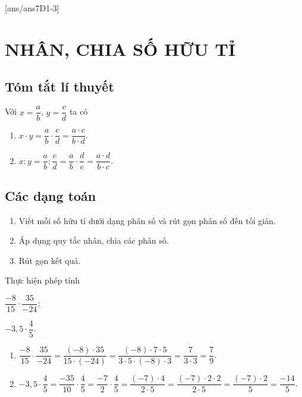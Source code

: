 [ans/ans7D1-3]

\section{NHÂN, CHIA SỐ HỮU TỈ}
\subsection{Tóm tắt lí thuyết}
Với $x=\dfrac{a}{b}$, $y=\dfrac{c}{d}$ ta có
	\begin{enumerate}[\tickEX]
\item $x\cdot y= \dfrac{a}{b}\cdot \dfrac{c}{d} = \dfrac{a \cdot c}{b \cdot d}$.
\item $x:  y= \dfrac{a}{b} : \dfrac{c}{d} = \dfrac{a}{b} \cdot \dfrac{d}{c}=\dfrac{a \cdot d}{b \cdot c}$.
	\end{enumerate}

\subsection{Các dạng toán}
\begin{dang}
	\begin{enumerate}[\tickEX]
		\item Viết mỗi số hữu tỉ dưới dạng phân số và rút gọn phân số đến tối giản.
		\item Áp dụng quy tắc nhân, chia các phân số.
		\item Rút gọn kết quả.
	\end{enumerate}
\end{dang}

\begin{vd}
	Thực hiện phép tính
		\begin{listEX}[2]
		\item $\dfrac{-8}{15} \cdot \dfrac{35}{-24}$;
		\item $-3,5 \cdot \dfrac{4}{5}$. 
	\end{listEX}
	\loigiai
	{\begin{enumerate}
			\item $\dfrac{-8}{15} \cdot \dfrac{35}{-24}= \dfrac{(-8) \cdot 35 }{15 \cdot (-24)} = \dfrac{(-8) \cdot 7 \cdot 5}{3 \cdot 5 \cdot (-8) \cdot 3} = \dfrac{7}{3\cdot 3} = \dfrac{7}{9} $.
			\item $-3,5 \cdot \dfrac{4}{5} = \dfrac{-35}{10} \cdot \dfrac{4}{5} = \dfrac{-7}{2} \cdot \dfrac{4}{5} = \dfrac{(-7) \cdot 4}{2 \cdot 5} =  \dfrac{(-7) \cdot 2 \cdot 2}{2 \cdot 5} =  \dfrac{(-7) \cdot 2}{5} =\dfrac{-14}{5}$.
		\end{enumerate}
	}
\end{vd}

